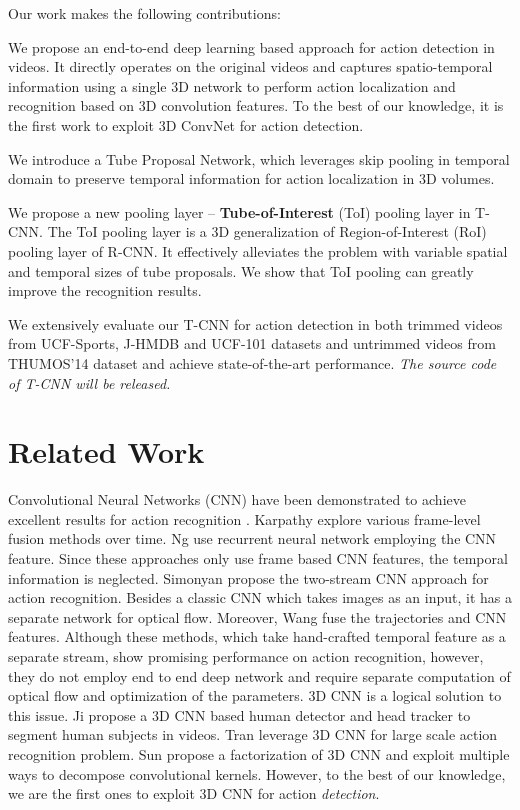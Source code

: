 \documentclass[10pt,twocolumn,letterpaper]{article}
\begin{document}
Our work makes the following contributions:







 We propose an end-to-end deep learning based approach for action detection in videos. It directly operates on the original videos and captures spatio-temporal information using a single 3D network to perform action localization and recognition based on 3D convolution features. To the best of our knowledge, it is the first work to exploit 3D ConvNet for action detection.

 We introduce a Tube Proposal Network, which leverages skip pooling in temporal domain to preserve temporal information for action localization in 3D volumes.

 We propose a new pooling layer -- {\bf Tube-of-Interest} (ToI) pooling layer in T-CNN. The ToI pooling layer is a 3D generalization of Region-of-Interest (RoI) pooling layer of R-CNN. It effectively alleviates the problem with variable spatial and temporal sizes of tube proposals. We show that ToI pooling can greatly improve the recognition results.

 We extensively evaluate our T-CNN for action detection in both trimmed videos from UCF-Sports, J-HMDB and UCF-101 datasets and untrimmed videos from THUMOS'14 dataset and achieve state-of-the-art performance. \textit{The source code of T-CNN will be released.}





\section{Related Work}\label{sec:related_work}
Convolutional Neural Networks (CNN) have been demonstrated to achieve excellent results for action recognition \cite{lecun2015deep, action_survey}. Karpathy \etal \cite{karpathy2014large}  explore various frame-level fusion methods over time. Ng \etal \cite{lstm_ng} use recurrent neural network employing the CNN feature. Since these approaches only use frame based CNN features, the temporal information is neglected. Simonyan \etal \cite{2stream_cnn_simonyan_2014two} propose the two-stream CNN approach for action recognition. Besides a classic CNN which takes images as an input, it has a separate network for optical flow. Moreover, Wang \etal fuse the trajectories and CNN features. Although these methods, which take hand-crafted temporal feature as a separate stream, show promising performance on action recognition, however, they do not employ end to end deep network and require separate computation of  optical flow  and optimization of the parameters. 3D CNN is a logical solution to this issue. Ji \etal \cite{ji20133d} propose a 3D CNN based human detector and head tracker to segment human subjects in videos. Tran \etal \cite{c3d} leverage 3D CNN for large scale action recognition problem. Sun \etal \cite{sun2015human} propose a factorization of 3D CNN and exploit multiple ways to decompose convolutional kernels. However, to the best of our knowledge, we are the first ones to exploit 3D CNN for action {\em detection}.
\end{document}
